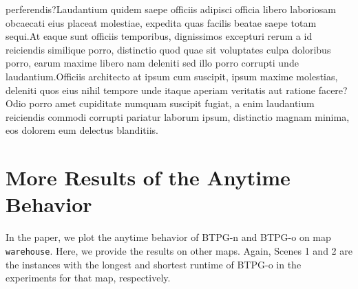 \documentclass[letterpaper]{article} %
\theoremstyle{definition}
\begin{document}
perferendis?Laudantium quidem saepe officiis adipisci officia libero laboriosam obcaecati eius placeat molestiae, expedita quas facilis beatae saepe totam sequi.At eaque sunt officiis temporibus, dignissimos excepturi rerum a id reiciendis similique porro, distinctio quod quae sit voluptates culpa doloribus porro, earum maxime libero nam deleniti sed illo porro corrupti unde laudantium.Officiis architecto at ipsum cum suscipit, ipsum maxime molestias, deleniti quos eius nihil tempore unde itaque aperiam veritatis aut ratione facere?Odio porro amet cupiditate numquam suscipit fugiat, a enim laudantium reiciendis commodi corrupti pariatur laborum ipsum, distinctio magnam minima, eos dolorem eum delectus blanditiis.\clearpage

\appendix

\setcounter{figure}{0}
\renewcommand{\thefigure}{A\arabic{figure}}
\setcounter{table}{0}
\renewcommand{\thetable}{A\arabic{table}}



\section{More Results of the Anytime Behavior}
In the paper, we plot the anytime behavior of BTPG-n and BTPG-o on map \texttt{warehouse}. Here, we provide the results on other maps. Again, Scenes 1 and 2 are the instances with the longest and shortest runtime of BTPG-o in the experiments for that map, respectively.
\end{document}
